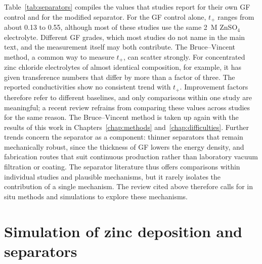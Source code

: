 Table~\ref{tab:separators} compiles the values that studies report for their own GF control and for the modified separator.
For the GF control alone, $t_+$ ranges from about 0.13 to 0.55, although most of these studies use the same \SI{2}{M} ZnSO$_4$ electrolyte.
Different GF grades, which most studies do not name in the main text, and the measurement itself may both contribute.
The Bruce--Vincent method, a common way to measure $t_+$, can scatter strongly.
For concentrated zinc chloride electrolytes of almost identical composition, for example, it has given transference numbers that differ by more than a factor of three\cite{gomez_vazquez_measuring_2025}.
The reported conductivities show no consistent trend with $t_+$.
Improvement factors therefore refer to different baselines, and only comparisons within one study are meaningful; a recent review refrains from comparing these values across studies for the same reason\cite{fang_composite_2026}.
The Bruce--Vincent method is taken up again with the results of this work in Chapters~\ref{chap:methods} and~\ref{chap:difficulties}.
Further trends concern the separator as a component: thinner separators that remain mechanically robust, since the thickness of GF lowers the energy density\cite{nian_advancements_2025,liu_functional_2024}, and fabrication routes that suit continuous production rather than laboratory vacuum filtration or coating\cite{fang_composite_2026}.
The separator literature thus offers comparisons within individual studies and plausible mechanisms, but it rarely isolates the contribution of a single mechanism.
The review cited above therefore calls for in situ methods and simulations to explore these mechanisms\cite{gu_role_2025}.

\section{Simulation of zinc deposition and separators}
\label{sec:simulation}

